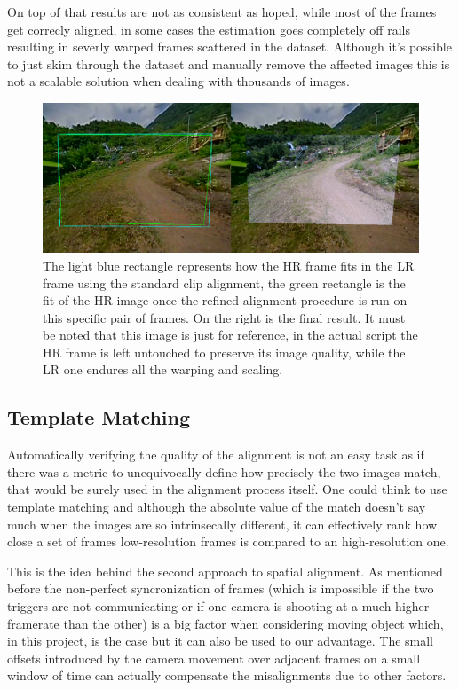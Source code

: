 On top of that results are not as consistent as hoped, while most of the frames get correcly aligned, in some cases the estimation goes completely off rails resulting in severly warped frames scattered in the dataset. Although it's possible to just skim through the dataset and manually remove the affected images this is not a scalable solution when dealing with thousands of images.

\begin{figure}[H]
  \centering
  \includegraphics[scale=1.2]{figures/deep_match_sbs.png}
  \caption{The light blue rectangle represents how the HR frame fits in the LR frame using the standard clip alignment, the green rectangle is the fit of the HR image once the refined alignment procedure is run on this specific pair of frames. On the right is the final result. It must be noted that this image is just for reference, in the actual script the HR frame is left untouched to preserve its image quality, while the LR one endures all the warping and scaling.}
  \label{img:deep_match}
\end{figure}

\subsection {Template Matching}
\label{subsec:template_match}

Automatically verifying the quality of the alignment is not an easy task as if there was a metric to unequivocally define how precisely the two images match, that would be surely used in the alignment process itself. One could think to use template matching and although the absolute value of the match doesn't say much when the images are so intrinsecally different, it can effectively rank how close a set of frames low-resolution frames is compared to an high-resolution one.

This is the idea behind the second approach to spatial alignment. As mentioned before the non-perfect syncronization of frames (which is impossible if the two triggers are not communicating or if one camera is shooting at a much higher framerate than the other) is a big factor when considering moving object which, in this project, is the case but it can also be used to our advantage. The small offsets introduced by the camera movement over adjacent frames on a small window of time can actually compensate the misalignments due to other factors.

